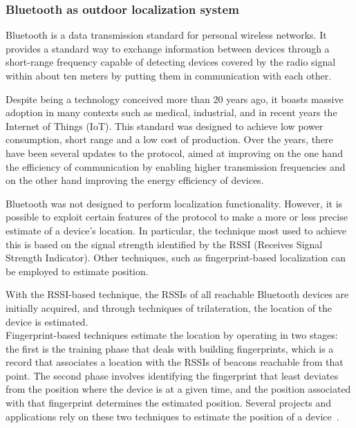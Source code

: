 \subsubsection{Bluetooth as outdoor localization system}
Bluetooth is a data transmission standard for personal wireless networks. It provides a standard way to exchange information between
devices through a short-range frequency capable of detecting devices covered by the radio signal within about ten meters by putting them
in communication with each other.

Despite being a technology conceived more than 20 years ago, it boasts massive adoption in many contexts such as medical, industrial, and in
recent years the Internet of Things (IoT). This standard was designed to achieve low power consumption, short range
and a low cost of production. Over the years, there have been several updates to the protocol, aimed at improving on the one hand the efficiency of
communication by enabling higher transmission frequencies and on the other hand improving the energy efficiency of devices.

Bluetooth was not designed to perform localization functionality. However, it is possible to exploit certain
features of the protocol to make a more or less precise estimate of a device's location. In particular, the technique most
used to achieve this is based on the signal strength identified by the RSSI (Receives Signal Strength Indicator).
Other techniques, such as fingerprint-based localization can be employed to estimate position.

With the RSSI-based technique, the RSSIs of all reachable Bluetooth devices are initially acquired, and through techniques of trilateration, the
location of the device is estimated.\\
Fingerprint-based techniques estimate the location by operating in two stages: the first is the training phase that deals with building fingerprints,
which is a record that associates a location with the RSSIs of beacons reachable from that point.
The second phase involves identifying the fingerprint that least deviates from the position where the device is at a given time, and the
position associated with that fingerprint determines the estimated position. Several projects and applications rely on these two techniques to
estimate the position of a device~\cite{mcconville2021vesta, samuel2021smart}.

